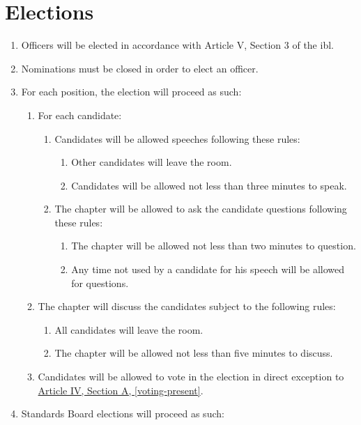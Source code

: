 \section{Elections}
	\label{elections}
	\begin{enumerate}
		\item Officers will be elected in accordance with Article V, Section 3 of the \gls{ibl}.
		\item Nominations must be closed in order to elect an officer.
		\item For each position, the election will proceed as such:
			\begin{enumerate}
				\item For each candidate:
					\begin{enumerate}
						\item Candidates will be allowed speeches following
						these rules:
							\begin{enumerate}
								\item Other candidates will leave the room.
								\item Candidates will be allowed not less than
								three minutes to speak.
							\end{enumerate}
						\item The chapter will be allowed to ask the
						candidate questions following these rules:
							\begin{enumerate}
								\item The chapter will be allowed not less
								than two minutes to question.
								\item Any time not used by a candidate for his
								speech will be allowed for questions.
							\end{enumerate}
					\end{enumerate}
				\item The chapter will discuss the candidates subject to the
				following rules:
					\begin{enumerate}
						\item All candidates will leave the room.
						\item The chapter will be allowed not less than five
						minutes to discuss.
					\end{enumerate}
				\item Candidates will be allowed to vote in the election in direct exception to \hyperref[voting-present]{Article IV, Section A, \autoref*{voting-present}}.
			\end{enumerate}
    \item Standards Board elections will proceed as such:

\end{enumerate}
